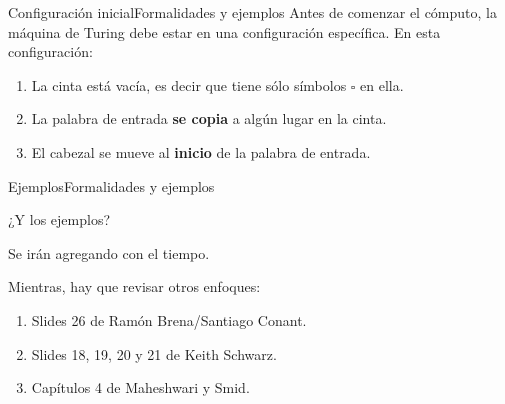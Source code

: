 \documentclass[spanish, handout]{beamer}
\begin{document}
\begin{frame}{Configuración inicial}{Formalidades y ejemplos}
    Antes de comenzar el cómputo, la máquina de Turing debe estar en una configuración específica. En esta configuración:

    \bigskip

    \begin{enumerate}
        \item La cinta está vacía, es decir que tiene sólo símbolos $\square$ en ella. \pause
        \item La palabra de entrada \textbf{se copia} a algún lugar en la cinta. \pause
        \item El cabezal se mueve al \textbf{inicio} de la palabra de entrada.
    \end{enumerate}
    
\end{frame}

\begin{frame}{Ejemplos}{Formalidades y ejemplos}
    \begin{center}
        {\Huge ¿Y los ejemplos?}
    \end{center}
    \begin{center}
        {\Large Se irán agregando con el tiempo.}

        \bigskip

        Mientras, hay que revisar otros enfoques:

        \bigskip
        
        \begin{enumerate}
            \item Slides 26 de Ramón Brena/Santiago Conant.
            \item Slides 18, 19, 20 y 21 de Keith Schwarz.
            \item Capítulos 4 de Maheshwari y Smid.
        \end{enumerate}
    \end{center}

\end{frame}



% 
% 
\end{document}
